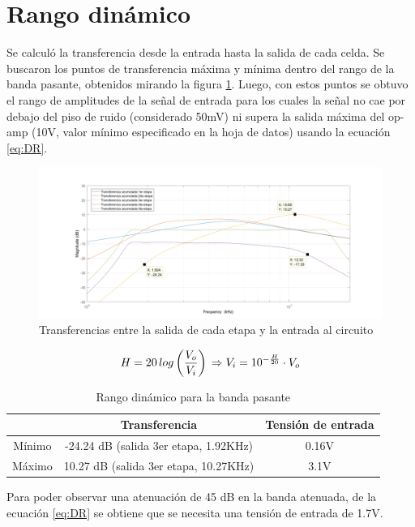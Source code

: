 \section{Rango din\'amico}
Se calcul\'o la transferencia desde la entrada hasta la salida de cada celda. Se buscaron los puntos de transferencia m\'axima y m\'inima dentro del rango de la banda pasante, obtenidos mirando la figura \ref{fig:DR}. Luego, con estos puntos se obtuvo el rango de amplitudes de la se\~nal de entrada para los cuales la se\~nal no cae por debajo del piso de ruido (considerado 50mV) ni supera la salida m\'axima del op-amp (10V, valor m\'inimo especificado en la hoja de datos) usando la ecuaci\'on \ref{eq:DR}. 

\begin{figure}[H]
	\centering
	\includegraphics[width=\textwidth]{imagenes/DR.png}
	\caption{Transferencias entre la salida de cada etapa y la entrada al circuito}
	\label{fig:DR}
\end{figure}

\begin{equation}
	H=20\, log\left(\frac{V_o}{V_i}\right) \\
	\Rightarrow V_i = 10^{-\frac{H}{20}}\cdot V_o
	\label{eq:DR}
\end{equation}

\begin{table}
	\centering
	\begin{tabular}{||ccc||}
	\hline 
	 & Transferencia & Tensi\'on de entrada \\ 
	\hline 
	M\'inimo & -24.24 dB (salida 3er etapa, 1.92KHz) & 0.16V \\ 
	\hline 
	M\'aximo & 10.27 dB (salida 3er etapa, 10.27KHz) & 3.1V \\ 
	\hline 
	\end{tabular} 
	\caption{Rango din\'amico para la banda pasante}
	\label{tab:DR}
\end{table}


Para poder observar una atenuaci\'on de 45 dB en la banda atenuada, de la ecuaci\'on \ref{eq:DR} se obtiene que se necesita una tensi\'on de entrada de 1.7V.

